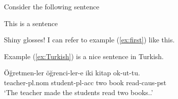\documentclass{article}
\title{}
\author{}
\date{}
\begin{document}
Consider the following sentence

\begin{exe}
\ex\label{ex:first} This is a sentence
\ex
    \begin{xlist}
    \end{xlist}

\end{exe}

Shiny glosses!  I can refer to example (\ref{ex:first}) like this. %

Example (\ref{ex:Turkish}) is a nice sentence in Turkish.


\begin{exe}
    \ex\label{ex:Turkish}
        \gll 
       Öğretmen-ler öğrenci-ler-e iki kitap ok-ut-tu.\\
       teacher-{\sc pl.nom} student-{\sc pl-acc} two book read-{\sc caus-pst}\\ %
        `The teacher made the students read two books..'
\end{exe}






\end{document}
